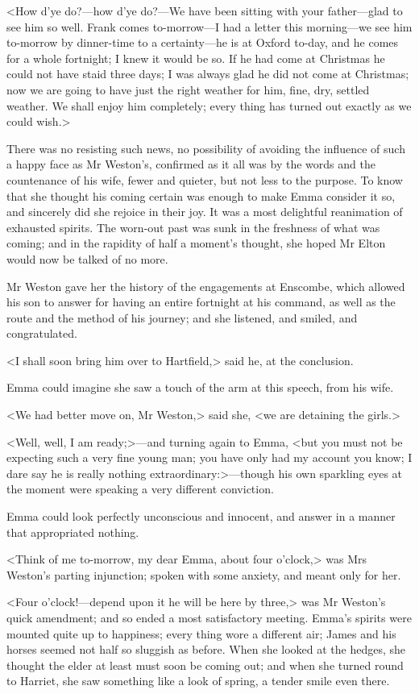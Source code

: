 <How d'ye do?—how d'ye do?—We have been sitting with your father—glad to see him so well. Frank comes to-morrow—I had a letter this morning—we see him to-morrow by dinner-time to a certainty—he is at Oxford to-day, and he comes for a whole fortnight; I knew it would be so. If he had come at Christmas he could not have staid three days; I was always glad he did not come at Christmas; now we are going to have just the right weather for him, fine, dry, settled weather. We shall enjoy him completely; every thing has turned out exactly as we could wish.>

There was no resisting such news, no possibility of avoiding the influence of such a happy face as Mr Weston's, confirmed as it all was by the words and the countenance of his wife, fewer and quieter, but not less to the purpose. To know that she thought his coming certain was enough to make Emma consider it so, and sincerely did she rejoice in their joy. It was a most delightful reanimation of exhausted spirits. The worn-out past was sunk in the freshness of what was coming; and in the rapidity of half a moment's thought, she hoped Mr Elton would now be talked of no more.

Mr Weston gave her the history of the engagements at Enscombe, which allowed his son to answer for having an entire fortnight at his command, as well as the route and the method of his journey; and she listened, and smiled, and congratulated.

<I shall soon bring him over to Hartfield,> said he, at the conclusion.

Emma could imagine she saw a touch of the arm at this speech, from his wife.

<We had better move on, Mr Weston,> said she, <we are detaining the girls.>

<Well, well, I am ready;>—and turning again to Emma, <but you must not be expecting such a very fine young man; you have only had my account you know; I dare say he is really nothing extraordinary:>—though his own sparkling eyes at the moment were speaking a very different conviction.

Emma could look perfectly unconscious and innocent, and answer in a manner that appropriated nothing.

<Think of me to-morrow, my dear Emma, about four o'clock,> was Mrs Weston's parting injunction; spoken with some anxiety, and meant only for her.

<Four o'clock!—depend upon it he will be here by three,> was Mr Weston's quick amendment; and so ended a most satisfactory meeting. Emma's spirits were mounted quite up to happiness; every thing wore a different air; James and his horses seemed not half so sluggish as before. When she looked at the hedges, she thought the elder at least must soon be coming out; and when she turned round to Harriet, she saw something like a look of spring, a tender smile even there.

